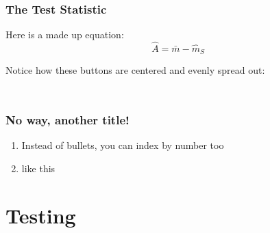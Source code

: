 \documentclass[
    11pt, %
    aspectratio=169, %
]{beamer}
\begin{document}


\begin{frame}
\label{Test Stat}
	\frametitle{The Test Statistic}
		
        Here is a made up equation:
        $$ \hat{A} = \bar{m}-\hat{m}_S$$ \newline

        Notice how these buttons are centered and evenly spread out:\newline

        \begin{columns}[t] %
		\begin{column}{0.25\textwidth} %
                \hyperlink{Terms}{}
		\end{column}
  		\begin{column}{0.25\textwidth} %
                \hyperlink{Definitions}{}
		\end{column}
            \begin{column}{0.25\textwidth} %
                \hyperlink{Theorems}{}
		\end{column}
	\end{columns}
        
\end{frame}

\begin{frame}
	\frametitle{No way, another title!}
            \begin{enumerate}
                \item Instead of bullets, you can index by number too\newline
                \item like this
            \end{enumerate}
\end{frame}

\section{Testing}
\end{document}
